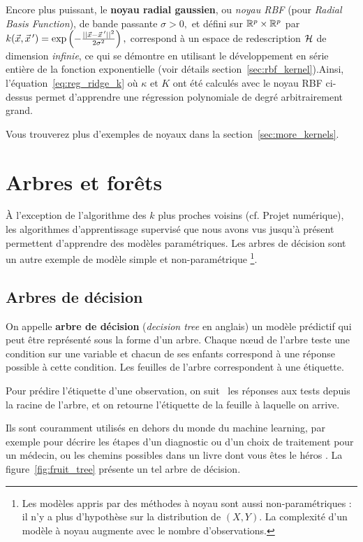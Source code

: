 Encore plus puissant, le \textbf{noyau radial gaussien}, ou {\it noyau RBF}
(pour {\it Radial Basis Function}), de bande passante $\sigma > 0,$ et défini
sur $\mathbb{R}^p \times \mathbb{R}^p$ par
$k(\xx, \xx^\prime) = \exp\left( - \frac{||\xx - \xx^\prime||^2}{2 \sigma^2}
\right),$ correspond à un espace de redescription $\mathcal{H}$ de dimension {\it
  infinie}, ce qui se démontre en utilisant le développement en série entière
de la fonction exponentielle (voir détails section~\ref{sec:rbf_kernel}).Ainsi,
l'équation~\eqref{eq:reg_ridge_k} où $\kappa$ et $K$ ont été calculés avec le
noyau RBF ci-dessus permet d'apprendre une régression polynomiale de degré
arbitrairement grand.

Vous trouverez plus d'exemples de noyaux dans la section~\ref{sec:more_kernels}.


\section{Arbres et forêts}
À l'exception de l'algorithme des $k$ plus proches voisins (cf. Projet numérique), les
algorithmes d'apprentissage supervisé que nous avons vus jusqu'à présent
permettent d'apprendre des modèles paramétriques. Les arbres de décision sont
un autre exemple de modèle simple et non-paramétrique \footnote{Les modèles
  appris par des méthodes à noyau sont aussi non-paramétriques : il n'y a plus
  d'hypothèse sur la distribution de $(X, Y)$. La complexité d'un modèle à
  noyau augmente avec le nombre d'observations.}.

\subsection{Arbres de décision}
On appelle \textbf{arbre de décision} (\textit{decision tree} en anglais) un
modèle prédictif qui peut être représenté sous la forme d'un arbre. Chaque
n{\oe}ud de l'arbre teste une condition sur une variable et chacun de ses
enfants correspond à une réponse possible à cette condition. Les feuilles de
l'arbre correspondent à une étiquette.

Pour prédire l'étiquette d'une observation, on \og suit \fg~les réponses aux
tests depuis la racine de l'arbre, et on retourne l'étiquette de la feuille à
laquelle on arrive.

Ils sont couramment utilisés en dehors du monde du machine learning, par
exemple pour décrire les étapes d'un diagnostic ou d'un choix de traitement
pour un médecin, ou les chemins possibles dans un \og livre dont vous êtes le
héros \fg. La figure~\ref{fig:fruit_tree} présente un tel arbre de décision.

